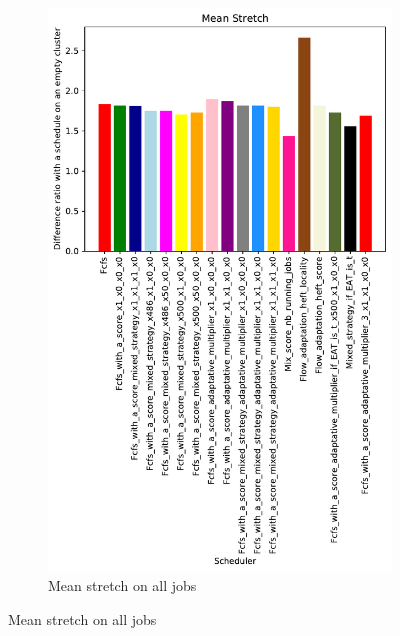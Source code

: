 \documentclass[a4paper]{article}
\begin{document}
\begin{figure}[H]
\begin{subfigure}[b]{0.4\linewidth}\centering\includegraphics[width=0.9\linewidth]{MBSS/plot/Results_FCFS_Score_Adaptative_Multiplier_2022-02-02->2022-02-03_V9271_Mean_Stretch_450_128_32_256_4_1024.pdf}\caption{Mean stretch on all jobs}\end{subfigure}

\end{figure}
\end{document}
